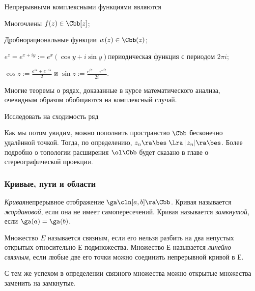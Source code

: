 \documentclass[a4paper]{article}
\begin{document}
\begin{ex}
Непрерывными комплексными функциями являются
\begin{items}{-2}
\item Многочлены $f(z) \in \Cbb[z]$;
\item Дробно\д рациональные функции $w(z) \in \Cbb(z)$;
\item $e^z = e^{x+iy} := e^x(\cos y + i\sin y)$\т периодическая функция с периодом $2\pi i$;
\item $\cos z := \frac{e^{iz} + e^{- i z}}{2}$ и $\sin z := \frac{e^{iz} - e^{ - iz}}{2i}$.
\end{items}
\end{ex}

Многие теоремы о рядах, доказанные в курсе математического анализа, очевидным образом обобщаются на
комплексный случай.

\begin{problem}
Исследовать на сходимость ряд
\end{problem}

Как мы потом увидим, можно пополнить пространство $\Cbb$ бесконечно удалённой точкой. Тогда, по определению,
$z_n\ra\bes \; \Lra \; |z_n|\ra\bes$. Более подробно о топологии расширения $\ol\Cbb$ будет сказано в главе
о стереографической проекции.

\subsubsection{Кривые, пути и области}

\begin{df}
\emph{Кривая}\т непрерывное отображение $\ga\cln [a,b] \ra \Cbb$.
Кривая называется \emph{жордановой}, если она не имеет самопересечений. Кривая называется \emph{замкнутой},
если $\ga(a) = \ga(b)$.
\end{df}

\begin{df}
Множество $E$ называется связным, если его нельзя разбить на два непустых
открытых относительно $Е$ подмножества.
Множество $Е$ называется \emph{линейно связным}, если любые две его точки можно соединить непрерывной кривой в $Е$.
\end{df}

\begin{note}
С тем же успехом в определении связного множества можно открытые множества заменить на замкнутые.
\end{note}
\end{document}
